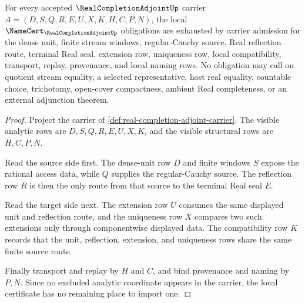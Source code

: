 \begin{theorem}
\label{thm:real-completion-adjoint-namecert-obligations}
For every accepted $\RealCompletionAdjointUp$ carrier $A=(D,S,Q,R,E,U,X,K,H,C,P,N)$, the local $\NameCert_{\RealCompletionAdjointUp}$ obligations are exhausted by carrier admission for the dense unit, finite stream windows, regular-Cauchy source, Real reflection route, terminal Real seal, extension row, uniqueness row, local compatibility, transport, replay, provenance, and local naming rows. No obligation may call on quotient stream equality, a selected representative, host real equality, countable choice, trichotomy, open-cover compactness, ambient Real completeness, or an external adjunction theorem.
\end{theorem}
\begin{proof}
Project the carrier of \autoref{def:real-completion-adjoint-carrier}. The visible analytic rows are $D,S,Q,R,E,U,X,K$, and the visible structural rows are $H,C,P,N$.

Read the source side first. The dense-unit row $D$ and finite windows $S$ expose the rational access data, while $Q$ supplies the regular-Cauchy source. The reflection row $R$ is then the only route from that source to the terminal Real seal $E$.

Read the target side next. The extension row $U$ consumes the same displayed unit and reflection route, and the uniqueness row $X$ compares two such extensions only through componentwise displayed data. The compatibility row $K$ records that the unit, reflection, extension, and uniqueness rows share the same finite source route.

Finally transport and replay by $H$ and $C$, and bind provenance and naming by $P,N$. Since no excluded analytic coordinate appears in the carrier, the local certificate has no remaining place to import one.
\end{proof}

